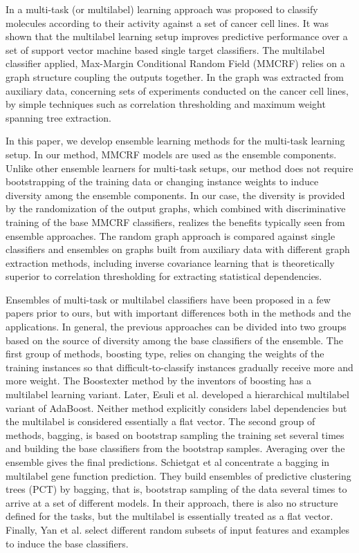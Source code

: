 \documentclass[runningheads,a4paper]{llncs}
\begin{document}
In \cite{su2010}  a multi-task (or multilabel) learning approach was proposed to classify molecules according to their activity against a set of cancer cell lines.
It was shown that the multilabel learning setup improves predictive performance over a set of support vector machine based single target classifiers. The multilabel classifier applied, Max-Margin Conditional Random Field (MMCRF)  \cite{rousu2007} relies on a graph structure coupling the outputs together. In \cite{su2010} the graph was extracted from auxiliary data, concerning sets of experiments conducted on the cancer cell lines, by simple techniques such as correlation thresholding and maximum weight spanning tree extraction. 

In this paper, we develop ensemble learning methods for the multi-task learning setup. In our method, MMCRF models are used as the ensemble components. 
Unlike other ensemble learners for multi-task setups, our method does not require bootstrapping of the training data or changing instance weights to induce diversity among the ensemble components. In our case, the diversity is provided by the randomization of the output graphs, which combined with discriminative training of the base MMCRF classifiers, realizes the benefits typically seen from ensemble approaches. The random graph approach is compared against single classifiers and ensembles  on graphs built from auxiliary data with different graph extraction methods, including inverse covariance learning \cite{Hastie08} that is theoretically superior to correlation thresholding for extracting statistical dependencies.

Ensembles of multi-task or multilabel classifiers have been proposed in a few papers prior to ours, but with important differences both in the methods
and the applications. In general, the previous approaches can be divided into two groups based on the source of diversity among the base classifiers of the ensemble.
The first group of methods, boosting type, relies on changing the weights of the training instances so that difficult-to-classify instances gradually receive more and more weight.
The Boostexter method \cite{SchSin00} by the inventors of boosting has a multilabel learning variant. Later, Esuli et al. \cite{Esu08} developed a hierarchical multilabel variant of
AdaBoost. Neither method explicitly considers label dependencies but the multilabel is considered essentially a flat vector. The second group of methods, bagging, is based on bootstrap sampling the training set several times and building the base classifiers from the bootstrap samples. Averaging over the ensemble gives the final predictions. Schietgat et al \cite{Sch10} concentrate a bagging in multilabel gene function prediction. They build ensembles of predictive clustering trees (PCT) by bagging, that is, bootstrap sampling of the data several times to arrive at a set of different models. In their approach, there is also no structure defined for the tasks, but the multilabel is essentially treated as a flat vector. Finally, Yan et al. \cite{yan2007model} select different random subsets of input features and 
examples to induce the base classifiers. 
\end{document}
